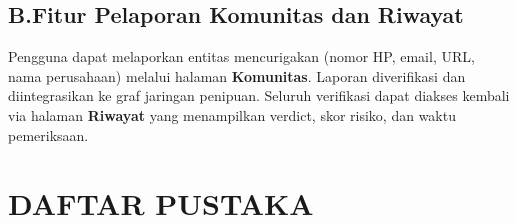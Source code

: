 \documentclass[12pt,a4paper]{article}
\begin{document}
\subsection*{B.\quad Fitur Pelaporan Komunitas dan Riwayat}

Pengguna dapat melaporkan entitas mencurigakan (nomor HP, email, URL, nama perusahaan) melalui halaman \textbf{Komunitas}. Laporan diverifikasi dan diintegrasikan ke graf jaringan penipuan. Seluruh verifikasi dapat diakses kembali via halaman \textbf{Riwayat} yang menampilkan verdict, skor risiko, dan waktu pemeriksaan.

\section*{DAFTAR PUSTAKA}
\end{document}

